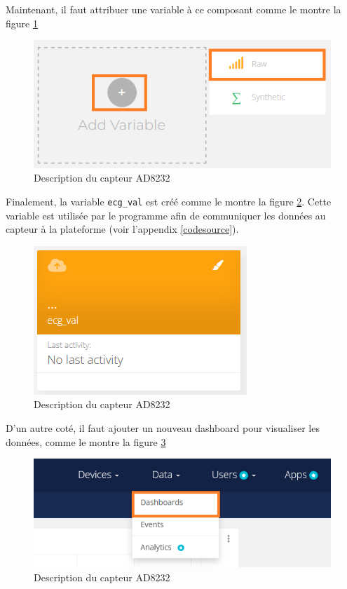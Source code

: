 Maintenant, il faut attribuer une variable à ce composant comme le montre la figure \ref{addnewdevice}

\begin{figure}[H]
  \centering
  \includegraphics[scale=.4]{imgs/addnewdevice.png}
  \caption{Description du capteur AD8232 \label{addnewdevice}}
\end{figure}

Finalement, la variable \texttt{ecg_val} est créé comme le montre la figure \ref{ecg_val}. Cette variable est utilisée par le programme afin de communiquer les données au capteur à la plateforme (voir l'appendix \ref{codesource}).

\begin{figure}[H]
  \centering
  \includegraphics[scale=.4]{imgs/ecg_val.png}
  \caption{Description du capteur AD8232 \label{ecg_val}}
\end{figure}

D'un autre coté, il faut ajouter un nouveau dashboard pour visualiser les données, comme le montre la figure \ref{dashboard}

\begin{figure}[H]
  \centering
  \includegraphics[scale=.4]{imgs/dashboard.png}
  \caption{Description du capteur AD8232 \label{dashboard}}
\end{figure}

